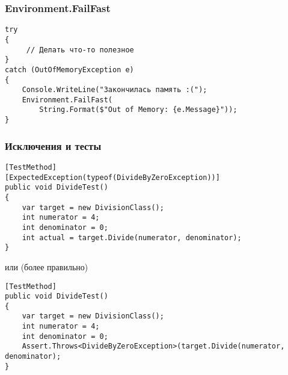 \documentclass[xetex,mathserif,serif]{beamer}
\begin{document}
    \begin{frame}[fragile]
        \frametitle{Environment.FailFast}
        \begin{verbatim}
try 
{
     // Делать что-то полезное
}
catch (OutOfMemoryException e) 
{
    Console.WriteLine("Закончилась память :(");
    Environment.FailFast(
        String.Format($"Out of Memory: {e.Message}"));
}
        \end{verbatim}
    \end{frame}

    \begin{frame}[fragile]
        \frametitle{Исключения и тесты}
        \begin{footnotesize}
            \begin{verbatim}
[TestMethod]
[ExpectedException(typeof(DivideByZeroException))]
public void DivideTest()
{
    var target = new DivisionClass();
    int numerator = 4;
    int denominator = 0;
    int actual = target.Divide(numerator, denominator);
}
            \end{verbatim}
        \end{footnotesize}
        или (более правильно)
        \begin{footnotesize}
            \begin{verbatim}
[TestMethod]
public void DivideTest()
{
    var target = new DivisionClass();
    int numerator = 4;
    int denominator = 0;
    Assert.Throws<DivideByZeroException>(target.Divide(numerator, denominator);
}
            \end{verbatim}
        \end{footnotesize}
    \end{frame}
\end{document}
